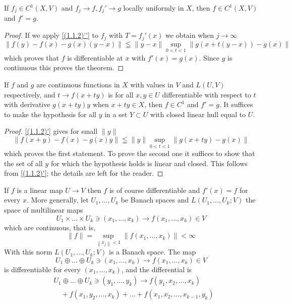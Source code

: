 \begin{theorem}
	If $f_{j} \in C^{1}(X, V)$ and $f_{j} \rightarrow f, f_{j}' \rightarrow g$ locally uniformly in $X$, then $f \in C^{1}(X, V)$ and $f'=g$.
\end{theorem}
\begin{proof}
	If we apply \eqref{(1.1.2)''} to $f_{j}$ with $T=f_{j}'(x)$ we obtain when $j \rightarrow \infty$
	\[
		\|f(y)-f(x)-g(x)(y-x)\| \leqq\|y-x\| \sup _{0<t<1}\|g(x+t(y-x))-g(x)\|
	\]
	which proves that $f$ is differentiable at $x$ with $f'(x)=g(x)$. Since $g$ is continuous this proves the theorem.
\end{proof}
\begin{theorem}
	If $f$ and $g$ are continuous functions in $X$ with values in $V$ and $L(U, V)$ respectively, and $t \rightarrow f(x+t y)$ is for all $x, y \in U$ differentiable with respect to $t$ with derivative $g(x+t y) y$ when $x+t y \in X$, then $f \in C^{1}$ and $f'=g$. It suffices to make the hypothesis for all $y$ in a set $Y\subset U$ with closed linear hull equal to $U$.
\end{theorem}
\begin{proof}
	\eqref{(1.1.2)'} gives for small $\|y\|$
	\[
		\|f(x+y)-f(x)-g(x) y\| \leqq\|y\| \sup _{0<t<1}\|g(x+t y)-g(x)\|
	\]
	which proves the first statement. To prove the second one it suffices to show that the set of all $y$ for which the hypothesis holds is linear and closed. This follows from \eqref{(1.1.2)'}; the details are left for the reader.
\end{proof}

If $f$ is a linear map $U \rightarrow V$ then $f$ is of course differentiable and $f'(x)=f$ for every $x$. More generally, let $U_{1}, \ldots, U_{k}$ be Banach spaces and $L\left(U_{1}, \ldots, U_{k} ; V\right)$ the space of multilinear maps
\[
	U_{1} \times \ldots \times U_{k} \ni\left(x_{1}, \ldots, x_{k}\right) \rightarrow f\left(x_{1}, \ldots, x_{k}\right) \in V
\]
which are continuous, that is,
\[
	\|f\|=\sup _{\left\|x_{j}\right\|<1}\left\|f\left(x_{1}, \ldots, x_{k}\right)\right\|<\infty
\]
With this norm $L\left(U_{1}, \ldots, U_{k} ; V\right)$ is a Banach space. The map
\[
	U_{1} \oplus \ldots \oplus U_{k} \ni\left(x_{1}, \ldots, x_{k}\right) \rightarrow f\left(x_{1}, \ldots, x_{k}\right) \in V
\]
is differentiable for every $\left(x_{1}, \ldots, x_{k}\right)$, and the differential is
\[
	\begin{aligned}
		 & U_{1} \oplus \ldots \oplus U_{k} \ni\left(y_{1}, \ldots, y_{k}\right) \rightarrow f\left(y_{1}, x_{2}, \ldots, x_{k}\right) \\
		 & \quad+f\left(x_{1}, y_{2}, \ldots, x_{k}\right)+\ldots+f\left(x_{1}, x_{2}, \ldots, x_{k-1}, y_{k}\right)
	\end{aligned}
\]


